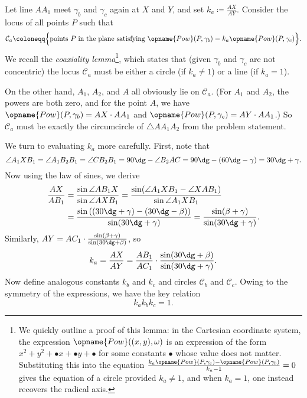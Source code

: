 Let line $AA_1$ meet $\gamma_b$ and $\gamma_c$ again at $X$ and $Y$,
and set $k_a \coloneqq \frac{AX}{AY}$.
Consider the locus of all points $P$ such that
\[ \mathcal C_a \coloneqq \Big\{ \text{points } P \text{ in the plane satisfying }
    \opname{Pow}(P, \gamma_b) = k_a \opname{Pow}(P, \gamma_c) \Big\}. \]
We recall the \emph{coaxiality lemma}\footnote{We quickly outline a proof of this lemma:
  in the Cartesian coordinate system, the expression $\opname{Pow}((x,y), \omega)$
  is an expression of the form $x^2 + y^2 + {\bullet} x + {\bullet} y + {\bullet}$
  for some constants ${\bullet}$ whose value does not matter.
  Substituting this into the equation
  $\frac{k_a \opname{Pow}(P, \gamma_c) - \opname{Pow}(P, \gamma_b)}{k_a-1} = 0$
  gives the equation of a circle provided $k_a \neq 1$,
  and when $k_a = 1$, one instead recovers the radical axis.},
which states that (given $\gamma_b$ and $\gamma_c$ are not concentric)
the locus $\mathcal C_a$ must be either a circle (if $k_a \neq 1$) or a line (if $k_a=1$).

On the other hand, $A_1$, $A_2$, and $A$ all obviously lie on $\mathcal C_a$.
(For $A_1$ and $A_2$, the powers are both zero, and for the point $A$,
we have $\opname{Pow}(P, \gamma_b) = AX \cdot AA_1$
and $\opname{Pow}(P, \gamma_c) = AY \cdot AA_1$.)
So $\mathcal C_a$ must be exactly the circumcircle of $\triangle AA_1A_2$
from the problem statement.

We turn to evaluating $k_a$ more carefully.
First, note that
\[ \angle A_1XB_1 = \angle A_1B_2B_1 = \angle CB_2B_1
  = 90\dg - \angle B_2AC = 90\dg - (60\dg-\gamma) = 30\dg + \gamma. \]
Now using the law of sines, we derive
\begin{align*}
  \frac{AX}{AB_1} &= \frac{\sin \angle AB_1X}{\sin \angle AXB_1}
  = \frac{\sin(\angle A_1XB_1 - \angle XAB_1)}{\sin \angle A_1XB_1} \\
  &= \frac{\sin\left( (30\dg+\gamma)-(30\dg-\beta) \right)}{\sin (30\dg+\gamma)}
  = \frac{\sin(\beta+\gamma)}{\sin (30\dg+\gamma)}.
\end{align*}
Similarly, $AY = AC_1 \cdot \frac{\sin(\beta+\gamma)}{\sin(30\dg+\beta)}$, so
\[ k_a = \frac{AX}{AY}
  = \frac{AB_1}{AC_1} \cdot \frac{\sin(30\dg+\beta)}{\sin(30\dg+\gamma)}. \]
Now define analogous constants $k_b$ and $k_c$
and circles $\mathcal C_b$ and $\mathcal C_c$.
Owing to the symmetry of the expressions, we have the key relation
\[ k_a k_b k_c = 1. \]

